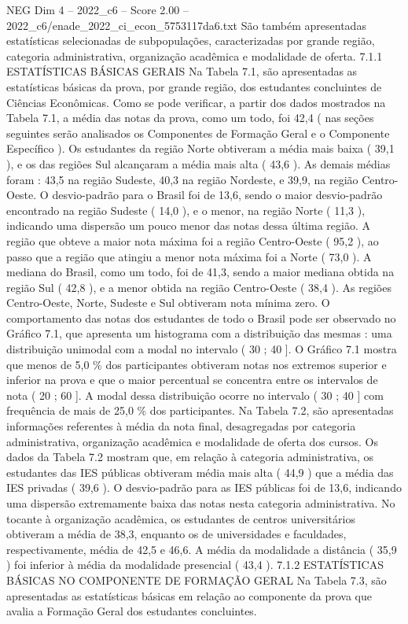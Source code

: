 \begin{textsample}{NEG Dim 4 – 2022\_c6 – Score 2.00 – 2022\_c6/enade\_2022\_ci\_econ\_5753117da6.txt}
São também apresentadas estatísticas selecionadas de subpopulações, caracterizadas por grande região, categoria administrativa, organização acadêmica e modalidade de oferta. 7.1.1 ESTATÍSTICAS BÁSICAS GERAIS Na Tabela 7.1, são apresentadas as estatísticas básicas da prova, por grande região, dos estudantes concluintes de Ciências Econômicas.
Como se pode verificar, a partir dos dados mostrados na Tabela 7.1, a média das notas da prova, como um todo, foi 42,4 ( nas seções seguintes serão analisados os Componentes de Formação Geral e o Componente Específico ).
Os estudantes da região Norte obtiveram a média mais baixa ( 39,1 ), e os das regiões Sul alcançaram a média mais alta ( 43,6 ).
As demais médias foram : 43,5 na região Sudeste, 40,3 na região Nordeste, e 39,9, na região Centro-Oeste.
O desvio-padrão para o Brasil foi de 13,6, sendo o maior desvio-padrão encontrado na região Sudeste ( 14,0 ), e o menor, na região Norte ( 11,3 ), indicando uma dispersão um pouco menor das notas dessa última região.
A região que obteve a maior nota máxima foi a região Centro-Oeste ( 95,2 ), ao passo que a região que atingiu a menor nota máxima foi a Norte ( 73,0 ).
A mediana do Brasil, como um todo, foi de 41,3, sendo a maior mediana obtida na região Sul ( 42,8 ), e a menor obtida na região Centro-Oeste ( 38,4 ).
As regiões Centro-Oeste, Norte, Sudeste e Sul obtiveram nota mínima zero.
O comportamento das notas dos estudantes de todo o Brasil pode ser observado no Gráfico 7.1, que apresenta um histograma com a distribuição das mesmas : uma distribuição unimodal com a modal no intervalo ( 30 ; 40 ].
O Gráfico 7.1 mostra que menos de 5,0 \% dos participantes obtiveram notas nos extremos superior e inferior na prova e que o maior percentual se concentra entre os intervalos de nota ( 20 ; 60 ].
A modal dessa distribuição ocorre no intervalo ( 30 ; 40 ] com frequência de mais de 25,0 \% dos participantes.
Na Tabela 7.2, são apresentadas informações referentes à média da nota final, desagregadas por categoria administrativa, organização acadêmica e modalidade de oferta dos cursos.
Os dados da Tabela 7.2 mostram que, em relação à categoria administrativa, os estudantes das IES públicas obtiveram média mais alta ( 44,9 ) que a média das IES privadas ( 39,6 ).
O desvio-padrão para as IES públicas foi de 13,6, indicando uma dispersão extremamente baixa das notas nesta categoria administrativa.
No tocante à organização acadêmica, os estudantes de centros universitários obtiveram a média de 38,3, enquanto os de universidades e faculdades, respectivamente, média de 42,5 e 46,6.
A média da modalidade a distância ( 35,9 ) foi inferior à média da modalidade presencial ( 43,4 ). 7.1.2 ESTATÍSTICAS BÁSICAS NO COMPONENTE DE FORMAÇÃO GERAL Na Tabela 7.3, são apresentadas as estatísticas básicas em relação ao componente da prova que avalia a Formação Geral dos estudantes concluintes.

\end{textsample}
